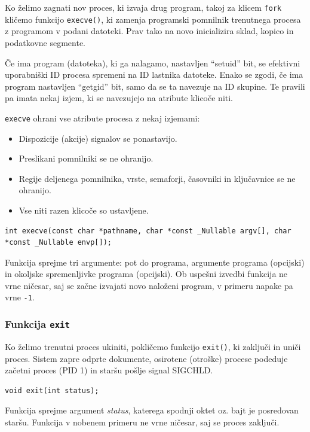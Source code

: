 \documentclass[a4paper,12pt,openright]{book}
\begin{document}
Ko želimo zagnati nov proces, ki izvaja drug program, takoj za klicem \texttt{fork} kličemo funkcijo \texttt{execve()}, ki zamenja programski pomnilnik trenutnega procesa z programom v podani datoteki.
Prav tako na novo inicializira sklad, kopico in podatkovne segmente.

Če ima program (datoteka), ki ga nalagamo, nastavljen ``setuid'' bit, se efektivni uporabniški ID procesa spremeni na ID lastnika datoteke.
Enako se zgodi, če ima program nastavljen ``getgid'' bit, samo da se ta navezuje na ID skupine.
Te pravili pa imata nekaj izjem, ki se navezujejo na atribute klicoče niti.

\texttt{execve} ohrani vse atribute procesa z nekaj izjemami:
\begin{itemize}
	\item Dispozicije (akcije) signalov se ponastavijo.
	\item Preslikani pomnilniki se ne ohranijo.
	\item Regije deljenega pomnilnika, vrste, semaforji, časovniki in ključavnice se ne ohranijo.
	\item Vse niti razen klicoče so ustavljene.
\end{itemize}

\begin{lstlisting}[style=func]
 int execve(const char *pathname, char *const _Nullable argv[], char *const _Nullable envp[]);
\end{lstlisting}

Funkcija sprejme tri argumente: pot do programa, argumente programa (opcijski) in okoljske spremenljivke programa (opcijski).
Ob uspešni izvedbi funkcija ne vrne ničesar, saj se začne izvajati novo naloženi program, v primeru napake pa vrne \texttt{-1}.

\subsubsection{Funkcija \texttt{exit}}

Ko želimo trenutni proces ukiniti, pokličemo funkcijo \texttt{exit()}, ki zaključi in uniči proces.
Sistem zapre odprte dokumente, osirotene (otroške) procese podeduje začetni proces (PID 1) in staršu pošlje signal SIGCHLD.

\begin{lstlisting}[style=func]
 void exit(int status);
\end{lstlisting}

Funkcija sprejme argument \textit{status}, katerega spodnji oktet oz. bajt je posredovan staršu.
Funkcija v nobenem primeru ne vrne ničesar, saj se proces zaključi.
\end{document}
